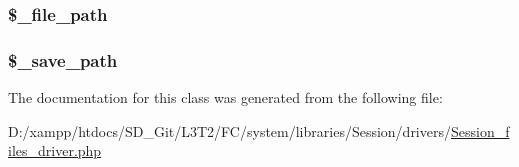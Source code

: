 \subsubsection[{\$\+\_\+file\+\_\+path}]{\setlength{\rightskip}{0pt plus 5cm}\$\+\_\+file\+\_\+path\hspace{0.3cm}{\ttfamily [protected]}}\label{class_c_i___session__files__driver_af2a67abb59f4c991dd98452ec6e6dcc7}
\hypertarget{class_c_i___session__files__driver_a6435cefa01b850e041ae9066224e8a4d}{}
\subsubsection[{\$\+\_\+save\+\_\+path}]{\setlength{\rightskip}{0pt plus 5cm}\$\+\_\+save\+\_\+path\hspace{0.3cm}{\ttfamily [protected]}}\label{class_c_i___session__files__driver_a6435cefa01b850e041ae9066224e8a4d}


The documentation for this class was generated from the following file\+:\begin{DoxyCompactItemize}
\item 
D\+:/xampp/htdocs/\+S\+D\+\_\+\+Git/\+L3\+T2/\+F\+C/system/libraries/\+Session/drivers/\hyperlink{_session__files__driver_8php}{Session\+\_\+files\+\_\+driver.\+php}\end{DoxyCompactItemize}
